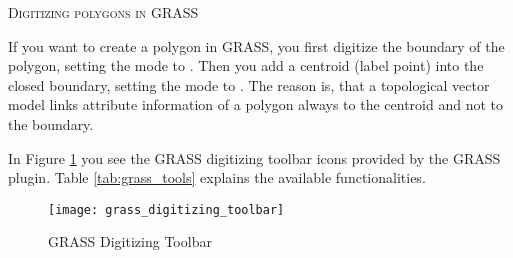 \begin{Tip}\caption{\textsc{Digitizing polygons in GRASS}}
If you want to create a polygon in GRASS, you first digitize the boundary of
the polygon, setting the mode to . Then you add a
centroid (label point) into the closed boundary, setting the mode to
. The reason is, that a topological vector model links
attribute information of a polygon always to the centroid and not to the
boundary.
\end{Tip}

\label{label_grasstoolbar}

In Figure \ref{fig:grass_digitizing_toolbar} you see the GRASS digitizing
toolbar icons provided by the GRASS plugin. Table \ref{tab:grass_tools}
explains the available functionalities.

\begin{figure}[h]
   \centering
   \texttt{[image: grass\_digitizing\_toolbar]}
   \caption{GRASS Digitizing Toolbar \nixcaption}\label{fig:grass_digitizing_toolbar}
\end{figure}

